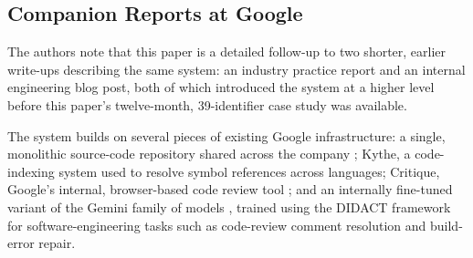 \subsection{Companion Reports at Google}
The authors note that this paper is a detailed follow-up to two
shorter, earlier write-ups describing the same system: an industry
practice report and an internal engineering blog post, both of which
introduced the system at a higher level before this paper's
twelve-month, 39-identifier case study was available.

The system builds on several pieces of existing Google infrastructure:
a single, monolithic source-code repository shared across the company
\cite{potvin2016google}; Kythe, a code-indexing system used to resolve
symbol references across languages; Critique, Google's internal,
browser-based code review tool \cite{sadowski2018modern}; and an
internally fine-tuned variant of the Gemini family of models
\cite{team2023gemini}, trained using the DIDACT framework for
software-engineering tasks such as code-review comment resolution and
build-error repair.